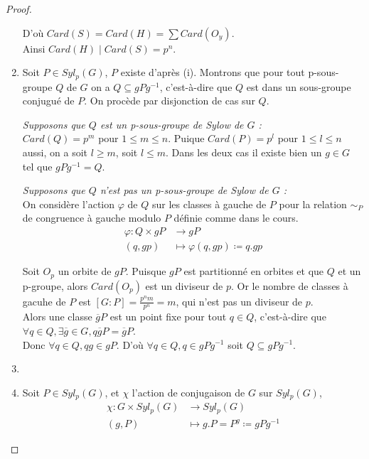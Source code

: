 \documentclass[french]{article}
\theoremstyle{definition}
\theoremstyle{plain}
\theoremstyle{plain}
\theoremstyle{plain}
\theoremstyle{plain}
\theoremstyle{plain}
\begin{document}
\begin{proof}
\begin{enumerate}[label={\upshape(\roman*)}]
D'où \( Card(S) = Card(H) = \sum Card(O_{y}) \). \\
Ainsi \( Card(H) \mid Card(S) = p^{n} \).

\item Soit \( P \in Syl_{p}({G}) \), \( P \) existe d'après (i). Montrons que pour tout p-sous-groupe \( Q \) de \( G \) on a \( Q \subseteq gPg^{-1} \), c'est-à-dire que \( Q \) est dans un sous-groupe conjugué de \( P \). On procède par disjonction de cas sur \( Q \).
	\par \textit{Supposons que \( Q \) est un p-sous-groupe de Sylow de \( G \) :}\\
	\( Card(Q) = p^{m}\) pour \( 1 \le m \le n \). Puique \( Card(P) = p^{l}\) pour 
	\( 1 \le l \le n \) aussi, on a soit \( l \ge m \), soit \( l \le m \). Dans les 
	deux cas il existe bien un \( g \in G \) tel que \( gPg^{-1} = Q \).
	
	\par \textit{Supposons que \( Q \) n'est pas un p-sous-groupe de Sylow de \( G \) :}\\ On considère l'action \( \varphi \) de \( Q \) sur les classes à gauche de \( P \) pour la relation \( \sim_{P} \) de congruence à gauche modulo \( P \) définie comme dans le cours. 
\begin{align*}
	\varphi : Q \times gP &\to gP \\
	(q,gp) &\mapsto \varphi(q,gp) \coloneq q.gp
\end{align*}

Soit \( O_{p} \) un orbite de \( gP \). Puisque \( gP \) est partitionné en orbites et que \( Q \) et un p-groupe, alors \( Card(O_{p}) \) est un diviseur de \( p \). Or le nombre de classes à gacuhe de \( P \) est \([G : P] = \frac{p^{n}m}{p^{n}} = m  \), qui n'est pas un diviseur de \( p \). \\
Alors une classe \( \overline{g}P \) est un point fixe pour tout \( q \in Q \), c'est-à-dire que \( \forall q \in Q, \exists \overline{g} \in G, q\overline{g}P = \overline{g}P \). \\
Donc \( \forall q \in Q, qg \in gP \). D'où \( \forall q \in Q, q \in gPg^{-1} \) soit \( Q \subseteq gPg^{-1} \).

\item

\item Soit \( P \in Syl_{p}(G) \), et \( \chi \) l'action de conjugaison de \( G \) sur \( Syl_{p}(G) \),
\begin{align*}
	\chi : G \times Syl_{p}(G) &\to Syl_{p}(G) \\
	(g,P) &\mapsto g.P = P^{g} \coloneq gPg^{-1}
\end{align*}


\end{enumerate}
\end{proof}
\end{document}
